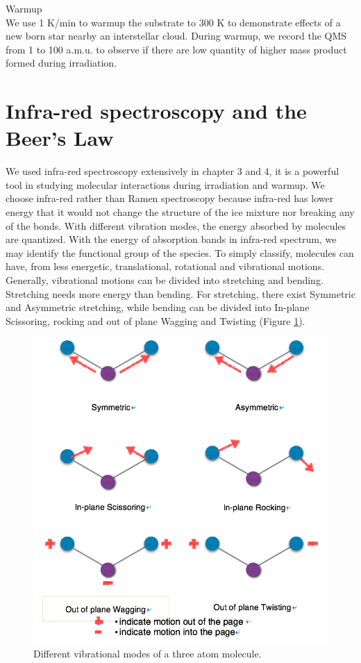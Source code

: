 Warmup\\
We use 1 K/min to warmup the substrate to 300 K to demonstrate effects of a new born star nearby an interstellar cloud. During warmup, we record the QMS from 1 to 100 a.m.u. to observe if there are low quantity of higher mass product formed during irradiation.\\

\section{Infra-red spectroscopy and the Beer’s Law}
\label{sec:spectroscopy}
We used infra-red spectroscopy extensively in chapter 3 and 4, it is a powerful tool in studying molecular interactions during irradiation and warmup. We choose infra-red rather than Ramen spectroscopy because infra-red has lower energy that it would not change the structure of the ice mixture nor breaking any of the bonds. With different vibration modes, the energy absorbed by molecules are quantized. With the energy of absorption bands in infra-red spectrum, we may identify the functional group of the species. To simply classify, molecules can have, from less energetic, translational, rotational and vibrational motions. Generally, vibrational motions can be divided into stretching and bending. Stretching needs more energy than bending. For stretching, there exist Symmetric and Asymmetric stretching, while bending can be divided into In-plane Scissoring, rocking and out of plane Wagging and Twisting (Figure \ref{fig:vibration}).\\
\begin{figure}
\centering
\includegraphics[width=\textwidth]{figures/chapter2/vibration.png}
\caption{Different vibrational modes of a three atom molecule.}
\label{fig:vibration}
\end{figure}

